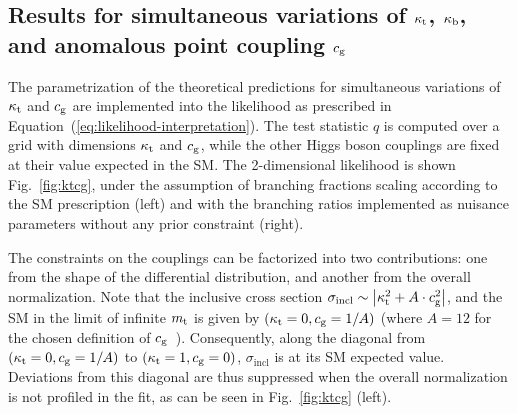 \subsection{Results for simultaneous variations of \texorpdfstring{$\kappa_{\mathrm{t}}$}{kt}, \texorpdfstring{$\kappa_{\mathrm{b}}$}{kb}, and anomalous point coupling \texorpdfstring{$c_\mathrm{g}$}{cg}}
\label{sec:interpretation-results-ktcgkb}


The parametrization of the theoretical predictions for simultaneous variations of $\kappa_{\mathrm{t}}$ and $c_\mathrm{g}$ are implemented into the likelihood as prescribed in Equation~(\ref{eq:likelihood-interpretation}).
% 
The test statistic $q$ is computed over a grid with dimensions $\kappa_{\mathrm{t}}$ and $c_\mathrm{g}$, while the other Higgs boson couplings are fixed at their value expected in the SM.
% 
The 2-dimensional likelihood is shown Fig.~\ref{fig:ktcg}, under the assumption of branching fractions scaling according to the SM prescription (left) and with the branching ratios implemented as nuisance parameters without any prior constraint (right).


The constraints on the couplings can be factorized into two contributions: one from the shape of the differential distribution, and another from the overall normalization.
% 
Note that the inclusive cross section $\sigma_\text{incl} \sim \left| \kappa_{\mathrm{t}}^2 + A \cdot c_\mathrm{g}^2 \right|$, and the SM in the limit of infinite $m_{\mathrm{t}}$ is given by $(\kappa_{\mathrm{t}}=0, c_\mathrm{g}=1/A)$ (where $A=12$ for the chosen definition of $c_\mathrm{g}$~\cite{Grazzini:2016paz}).
% 
Consequently, along the diagonal from $(\kappa_{\mathrm{t}}=0, c_\mathrm{g}=1/A)$ to $(\kappa_{\mathrm{t}}=1, c_\mathrm{g}=0)$, $\sigma_\text{incl}$ is at its SM expected value.
% 
Deviations from this diagonal are thus suppressed when the overall normalization is not profiled in the fit, as can be seen in Fig.~\ref{fig:ktcg} (left).


